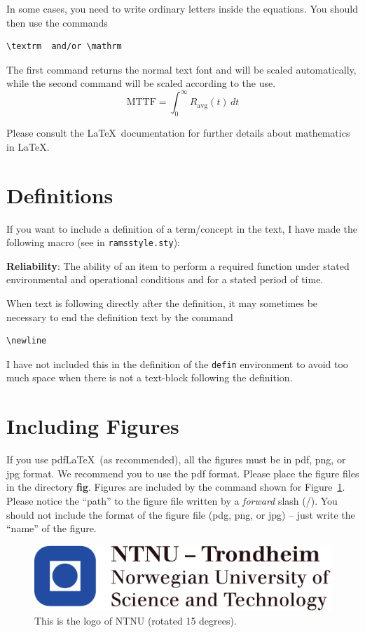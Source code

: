 In some cases, you need to write ordinary letters inside the equations. You should then use the commands 
\begin{verbatim}
\textrm  and/or \mathrm
\end{verbatim}
The first command returns the normal text font and will be scaled automatically, while the second command will be scaled according to the use.
\begin{equation*}
\textrm{MTTF}= \int_0^\infty R_\mathrm{avg}(t)\,dt
\end{equation*}



Please consult the \LaTeX\ documentation for further details about mathematics in \LaTeX.
\section*{Definitions}
If you want to include a definition of a term/concept in the text, I have made the following macro (see in \texttt{ramsstyle.sty}):
\begin{defin}
\textbf{Reliability}: The ability of an item to perform a required function under stated environmental and operational conditions and for a stated period of time.\newline
\end{defin}
When text is following directly after the definition, it may sometimes be necessary to end the definition text by the command
\begin{verbatim}
\newline
\end{verbatim}
I have not included this in the definition of the \texttt{defin} environment to avoid too much space when there is not a text-block following the definition.
\section{Including Figures}
If you use pdf\LaTeX\ (as recommended), all the figures must be in pdf, png, or jpg format. We recommend you to use the pdf format.  Please place the figure files in the directory \textbf{fig}. Figures are included by the command shown for Figure~\ref{fig1}. Please notice the ``path'' to the figure file written by a \emph{forward} slash (/). You should not include the format of the figure file (pdg, png, or jpg) -- just write the ``name'' of the figure. 
\begin{figure}
\centering
\includegraphics[scale=0.6,angle=15]{fig/NTNU}
\caption{This is the logo of NTNU (rotated 15 degrees).}
\label{fig1}
\end{figure}

